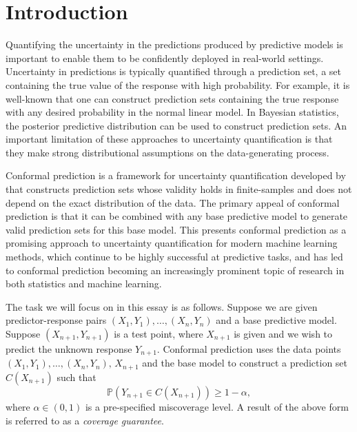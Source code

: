 \documentclass[11pt, titlepage]{article} %
\newcommand{\Prob}[1]{\mathbb{P}\left( #1 \right)}
\numberwithin{equation}{section}
\theoremstyle{definition}
\numberwithin{theorem}{section}
\numberwithin{lemma}{section}
\numberwithin{corollary}{section}
\numberwithin{proposition}{section}
\numberwithin{definition}{section}
\numberwithin{remark}{section}
\begin{document}


\newpage
\tableofcontents
\newpage


\section{Introduction}
\label{sec:intro}

Quantifying the uncertainty in the predictions produced by predictive models is important to enable them to be confidently deployed in real-world settings. Uncertainty in predictions is typically quantified through a prediction set, a set containing the true value of the response with high probability. For example, it is well-known that one can construct prediction sets containing the true response with any desired probability in the normal linear model. In Bayesian statistics, the posterior predictive distribution can be used to construct prediction sets. An important limitation of these approaches to uncertainty quantification is that they make strong distributional assumptions on the data-generating process. \vskip5pt

\noindent
Conformal prediction is a framework for uncertainty quantification developed by \cite{vovk2005algorithmic} that constructs prediction sets whose validity holds in finite-samples and does not depend on the exact distribution of the data. The primary appeal of conformal prediction is that it can be combined with any base predictive model to generate valid prediction sets for this base model. This presents conformal prediction as a promising approach to uncertainty quantification for modern machine learning methods, which continue to be highly successful at predictive tasks, and has led to conformal prediction becoming an increasingly prominent topic of research in both statistics and machine learning. \vskip5pt

\noindent
The task we will focus on in this essay is as follows. Suppose we are given predictor-response pairs \((X_1, Y_1), \ldots, (X_n, Y_n)\) and a base predictive model. Suppose \((X_{n+1}, Y_{n+1})\) is a test point, where \(X_{n+1}\) is given and we wish to predict the unknown response \(Y_{n+1}\). Conformal prediction uses  the data points \((X_1, Y_1), \ldots, (X_n, Y_n), \, X_{n+1}\) and the base model to construct a prediction set \(C(X_{n+1})\) such that \begin{equation}
    \Prob{Y_{n+1} \in C(X_{n+1})} \geq 1-\alpha,
\label{eqn:basic_coverage_guarantee}
\end{equation} where \(\alpha \in (0,1) \) is a pre-specified miscoverage level. A result of the above form is referred to as a \textit{coverage guarantee}.  \vskip5pt 
\end{document}
